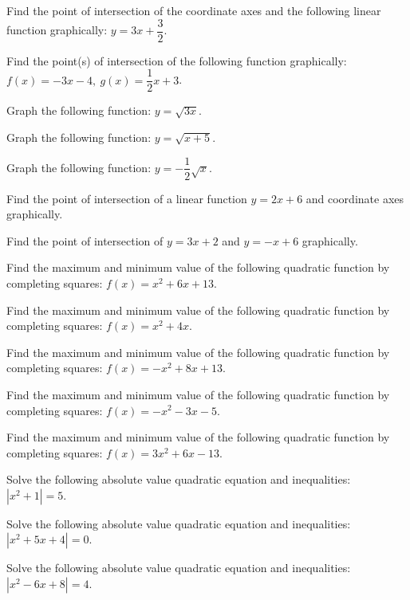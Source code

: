 \documentclass[11pt,a4paper]{article}
\begin{document}
\begin{shortlist}
\item Find the point of intersection of the coordinate axes and the following linear function graphically: $y=3x+\dfrac{3}{2}$.

\item Find the point(s) of intersection of the following function graphically: $f(x)=-3x-4,\ g(x)=\dfrac{1}{2}x+3$.

\item Graph the following function: $y=\sqrt{3x}$.

\item Graph the following function: $y=\sqrt{x+5}$.

\item Graph the following function: $y=-\dfrac{1}{2}\sqrt{x}$.

\item Find the point of intersection of a linear function $y=2x+6$ and coordinate axes graphically.

\item Find the point of intersection of $y=3x+2$ and $y=-x+6$ graphically.

\item Find the maximum and minimum value of the following quadratic function by completing squares: $f(x)=x^2+6x+13$.

\item Find the maximum and minimum value of the following quadratic function by completing squares: $f(x)=x^2+4x$.

\item Find the maximum and minimum value of the following quadratic function by completing squares: $f(x)=-x^2+8x+13$.

\item Find the maximum and minimum value of the following quadratic function by completing squares: $f(x)=-x^2-3x-5$.

\item Find the maximum and minimum value of the following quadratic function by completing squares: $f(x)=3x^2+6x-13$.

\item Solve the following absolute value quadratic equation and inequalities: $|x^2+1|=5$.

\item Solve the following absolute value quadratic equation and inequalities: $|x^2+5x+4|=0$.

\item Solve the following absolute value quadratic equation and inequalities: $|x^2-6x+8|=4$.


\end{shortlist}
\end{document}
